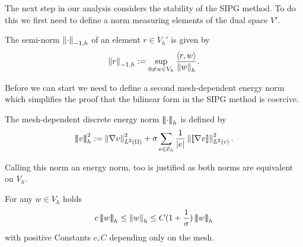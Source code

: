 The next step in our analysis considers the stability of the SIPG method. To do this we first need to define a norm measuring elements of the dual space $V'$.
\begin{definition} \label{def: h-1 seminorm}
	The semi-norm $\left\lVert \cdot \right\rVert_{-1,h} $ of an element $r \in V_h'$ is given by 
	\[
	\left\lVert r \right\rVert_{-1,h}  := \sup_{0 \neq w \in V_h} \frac {{ \langle r, w \rangle } } {\left\lVert w \right\rVert_{h}}.
	\]
\end{definition}
Before we can start we need to define a second mesh-dependent energy norm which simplifies the proof that the bilinear form in the SIPG method is coercive.
\begin{definition}\label{energy norm2}
	The mesh-dependent discrete energy norm $\left| \! \left| \! \left| \cdot \right| \! \right| \! \right|_{h} $ is defined by
	\[
	\left| \! \left| \! \left| v \right| \! \right| \! \right|_{h}^2 :=  \left\lVert \nabla v \right\rVert_{L^2(\Omega)}^2 +  \sigma \sum_{e \in \mathcal{E}_h} \frac 1 {|e|}\left\lVert \llbracket \nabla v \rrbracket \right\rVert_{L^2(e)}^2.
	\]
\end{definition}
Calling this norm an energy norm, too is justified as both norms are equivalent on $V_h$.
\begin{lemma} \label{la: equivalence energy norm}
	For any $w \in V_h$ holds
	\[
	c \eNormTwo w \leq \eNorm w \leq C(1+\frac  1 \sigma)\eNormTwo w
	\]
	with positive Constants $c, C$ depending only on the mesh.
\end{lemma}
